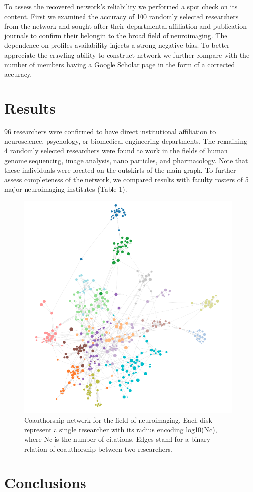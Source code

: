 \documentclass[twocolumn]{bmcart}%
\begin{document}
To assess the recovered network's reliability we performed a spot check
on its content. First we examined the accuracy of 100 randomly selected
researchers from the network and sought after their departmental
affiliation and publication journals to confirm their belongin to the
broad field of neuroimaging. The dependence on profiles availability
injects a strong negative bias. To better appreciate the crawling
ability to construct network we further compare with the number of
members having a Google Scholar page in the form of a corrected
accuracy.

\section{Results}\label{results}

96 researchers were confirmed to have direct institutional affiliation
to neuroscience, psychology, or biomedical engineering departments. The
remaining 4 randomly selected researchers were found to work in the
fields of human genome sequencing, image analysis, nano particles, and
pharmacology. Note that these individuals were located on the outskirts
of the main graph. To further assess completeness of the network, we
compared results with faculty rosters of 5 major neuroimaging institutes
(Table 1).

\begin{figure}[h!]
  \includegraphics[width=.47\textwidth]{neuroimaging-500}
  \caption{\label{centfig}
  Coauthorship network for the field of neuroimaging. Each disk represent a single researcher with its radius encoding log10(Nc), where Nc is the number of citations. Edges stand for a binary relation of coauthorship between two researchers.}
\end{figure}

\section{Conclusions}\label{conclusions}
\end{document}
